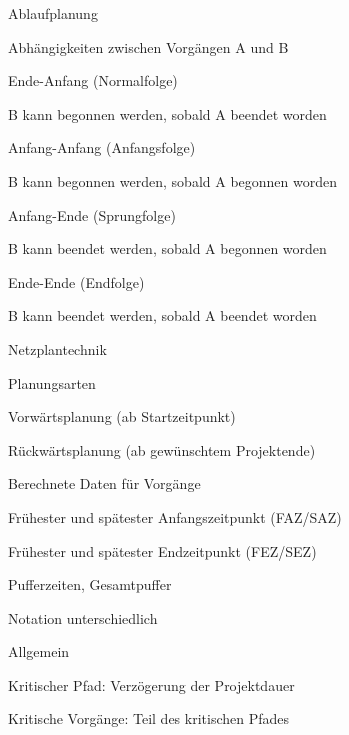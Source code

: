 \documentclass[a4paper]{article}
\begin{document}
\begin{multicols}{3}
  Ablaufplanung
  \begin{itemize*}
    \item Abhängigkeiten zwischen Vorgängen A und B
    \begin{itemize*}
      \item Ende-Anfang (Normalfolge)
      \begin{itemize*}
        \item B kann begonnen werden, sobald A beendet worden
      \end{itemize*}
      \item Anfang-Anfang (Anfangsfolge)
      \begin{itemize*}
        \item B kann begonnen werden, sobald A begonnen worden
      \end{itemize*}
      \item Anfang-Ende (Sprungfolge)
      \begin{itemize*}
        \item B kann beendet werden, sobald A begonnen worden
      \end{itemize*}
      \item Ende-Ende (Endfolge)
      \begin{itemize*}
        \item B kann beendet werden, sobald A beendet worden
      \end{itemize*}
    \end{itemize*}
    \item Netzplantechnik
    \begin{itemize*}
      \item Planungsarten
      \begin{itemize*}
        \item Vorwärtsplanung (ab Startzeitpunkt)
        \item Rückwärtsplanung (ab gewünschtem Projektende)
      \end{itemize*}
      \item Berechnete Daten für Vorgänge
      \begin{itemize*}
        \item Frühester und spätester Anfangszeitpunkt (FAZ/SAZ)
        \item Frühester und spätester Endzeitpunkt (FEZ/SEZ)
        \item Pufferzeiten, Gesamtpuffer
        \item Notation unterschiedlich
      \end{itemize*}
      \item Allgemein
      \begin{itemize*}
        \item Kritischer Pfad: Verzögerung der Projektdauer
        \item Kritische Vorgänge: Teil des kritischen Pfades
      \end{itemize*}
    \end{itemize*}
  \end{itemize*}


\end{multicols}
\end{document}
